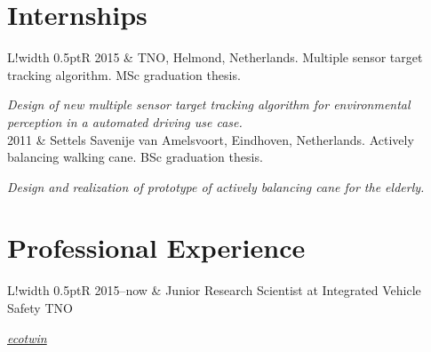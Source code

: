 \documentclass[a4paper,10pt]{article}
\newcommand\VRule{\color{lightgray}\vrule width 0.5pt}
\begin{document}
\section*{Internships}
\begin{tabular}{L!{\VRule}R}
2015 & TNO, Helmond, Netherlands. Multiple sensor target tracking algorithm. MSc graduation thesis. \par\textit{Design of new multiple sensor target tracking algorithm for environmental perception in a automated driving use case.}\\
2011 & Settels Savenije van Amelsvoort, Eindhoven, Netherlands. Actively balancing walking cane. BSc graduation thesis. \par\textit{Design and realization of prototype of actively balancing cane for the elderly.}\\
\end{tabular}

\section*{Professional Experience}
\begin{tabular}{L!{\VRule}R}
2015--now & Junior Research Scientist at Integrated Vehicle Safety TNO \par\textit{\href{https://www.youtube.com/watch?v=R08mg0XmbS0}{ecotwin}}\\
\end{tabular}
\end{document}
